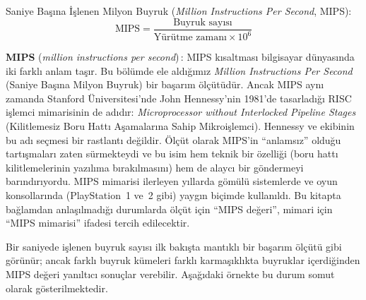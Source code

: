 Saniye Başına İşlenen Milyon Buyruk (\emph{Million Instructions Per Second}, MIPS):
\begin{equation}
\text{MIPS} = \frac{\text{Buyruk sayısı}}{\text{Yürütme zamanı} \times 10^6}
\label{eq:mips}
\end{equation}

\begin{terimnotu}
\textbf{MIPS} (\emph{million instructions per second})\,: MIPS kısaltması bilgisayar dünyasında iki farklı anlam taşır. Bu bölümde ele aldığımız \emph{Million Instructions Per Second} (Saniye Başına Milyon Buyruk) bir başarım ölçütüdür. Ancak MIPS aynı zamanda Stanford Üniversitesi'nde John Hennessy'nin 1981'de tasarladığı RISC işlemci mimarisinin de adıdır: \emph{Microprocessor without Interlocked Pipeline Stages} (Kilitlemesiz Boru Hattı Aşamalarına Sahip Mikroişlemci). Hennessy ve ekibinin bu adı seçmesi bir rastlantı değildir. Ölçüt olarak MIPS'in ``anlamsız'' olduğu tartışmaları zaten sürmekteydi ve bu isim hem teknik bir özelliği (boru hattı kilitlemelerinin yazılıma bırakılmasını) hem de alaycı bir göndermeyi barındırıyordu. MIPS mimarisi ilerleyen yıllarda gömülü sistemlerde ve oyun konsollarında (PlayStation~1 ve~2 gibi) yaygın biçimde kullanıldı. Bu kitapta bağlamdan anlaşılmadığı durumlarda ölçüt için ``MIPS değeri'', mimari için ``MIPS mimarisi'' ifadesi tercih edilecektir.
\end{terimnotu}

Bir saniyede işlenen buyruk sayısı ilk bakışta mantıklı bir başarım ölçütü gibi görünür; ancak farklı buyruk kümeleri farklı karmaşıklıkta buyruklar içerdiğinden MIPS değeri yanıltıcı sonuçlar verebilir. Aşağıdaki örnekte bu durum somut olarak gösterilmektedir.


